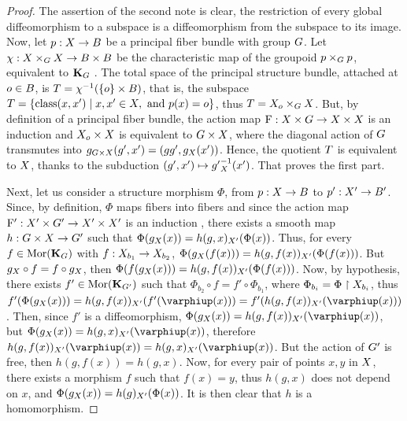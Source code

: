 \begin{proof}
  The assertion of the second note is clear,
  the restriction of every global diffeomorphism to a subspace is a diffeomorphism from the subspace to its image.
  Now,
  let $p : X \to B$ be a principal fiber bundle with group $G$.
  Let $\chi : X \times_G X \to B \times B$ be the characteristic map of the groupoid $p \times_G p$,
  equivalent to ${\mathbf K}_G$ .
  The total space of the principal structure bundle,
  attached at $o \in B$,
  is $T = \chi^{-1}(\{o\} \times B)$,
  that is,
  the subspace $T = \{ \operatorname{class}(x,x') \mid x,x' \in X, \text{ and } p(x) = o\}$,
  thus $T = X_o \times_G X$.
  But,
  by definition of a principal fiber bundle,
  the action map $\mathrm{F} : X \times G \to X \times X$ is an induction  and $X_o \times X$ is equivalent to $G \times X$,
  where the diagonal action of $G$ transmutes into $g_{G \times X}(g',x') = (gg',g_X(x'))$.
  Hence,
  the quotient $T$ is equivalent to $X$,
  thanks to the subduction $(g',x') \mapsto {g'}_X^{-1}(x')$.
  That proves the first part.
  
  Next,
  let us consider a structure morphism $\Phi$,
  from $p : X \to B$ to $p' : X' \to B'$.
  Since,
  by definition,
  $\Phi$ maps fibers into fibers and since the action map $\mathrm{F}' : X' \times G' \to X' \times X'$ is an induction ,
  there exists a smooth map $h : G \times X \to G'$ such that $\Phi(g_X(x)) = h(g,x)_{X'}(\Phi(x))$.
  Thus,
  for every $f \in {\operatorname{Mor}}({\mathbf K}_G)$ with $f : X_{b_1} \to X_{b_2}$,
  $\Phi(g_X(f(x))) = h(g,f(x))_{X'}(\Phi(f(x)))$.
  But $g_X \circ f = f \circ g_X$,
  then $\Phi(f(g_X(x))) = h(g,f(x))_{X'}(\Phi(f(x)))$.
  Now,
  by hypothesis,
  there exists $f' \in {\operatorname{Mor}}({\mathbf K}_{G'})$ such that $\Phi_{b_2} \circ f = f' \circ \Phi_{b_1}$,
  where $\Phi_{b_i} = \Phi \restriction X_{b_i}$,
  thus $f'(\Phi(g_\X(x))) = h(g,f(x))_{\X'}(f'(\phi(x))) = f'(h(g,f(x))_{\X'}(\phi(x)))$.
  Then,
  since $f'$ is a diffeomorphism,
  $\Phi(g_\X(x)) = h(g,f(x))_{\X'}(\phi(x))$,
  but $\Phi(g_\X(x)) = h(g,x)_{\X'}(\phi(x))$,
  therefore $h(g,f(x))_{\X'}(\phi(x)) = h(g,x)_{\X'}(\phi(x))$.
  But the action of $G'$ is free,
  then $h(g,f(x)) = h(g,x)$.
  Now,
  for every pair of points $x,y$ in $X$,
  there exists a morphism $f$ such that $f(x) = y$,
  thus $h(g,x)$ does not depend on $x$,
  and $\Phi(g_X(x)) = h(g)_{X'}(\Phi(x))$.
  It is then clear that $h$ is a homomorphism.
\end{proof}

